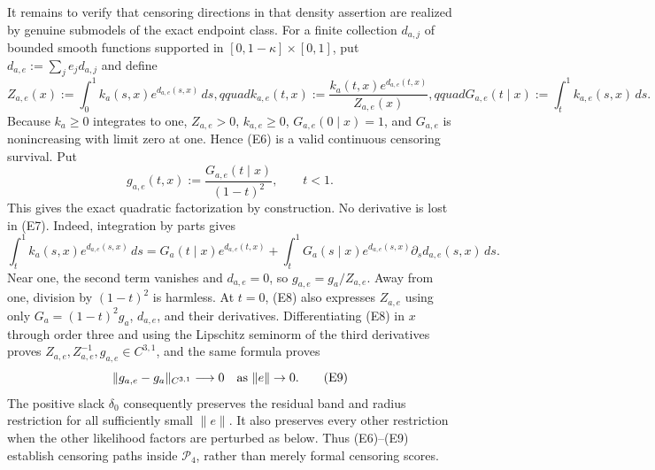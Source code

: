 It remains to verify that censoring directions in that density assertion are realized by genuine submodels of the exact endpoint class.  For a finite collection \(d_{a,j}\) of bounded smooth functions supported in \([0,1-\kappa]\times[0,1]\), put \(d_{a,e}:=\sum_je_jd_{a,j}\) and define
\[
 Z_{a,e}(x):=\int_0^1k_a(s,x)e^{d_{a,e}(s,x)}\,ds,qquad
 k_{a,e}(t,x):=\frac{k_a(t,x)e^{d_{a,e}(t,x)}}{Z_{a,e}(x)},qquad
 G_{a,e}(t\mid x):=\int_t^1k_{a,e}(s,x)\,ds.                           \tag{E6}
\]
Because \(k_a\ge0\) integrates to one, \(Z_{a,e}>0\), \(k_{a,e}\ge0\), \(G_{a,e}(0\mid x)=1\), and \(G_{a,e}\) is nonincreasing with limit zero at one.  Hence (E6) is a valid continuous censoring survival.  Put
\[
 g_{a,e}(t,x):=\frac{G_{a,e}(t\mid x)}{(1-t)^2},\qquad t<1.             \tag{E7}
\]
This gives the exact quadratic factorization by construction.  No derivative is lost in (E7).  Indeed, integration by parts gives
\[
 \int_t^1k_a(s,x)e^{d_{a,e}(s,x)}\,ds
 =G_a(t\mid x)e^{d_{a,e}(t,x)}
  +\int_t^1G_a(s\mid x)e^{d_{a,e}(s,x)}
                   \partial_sd_{a,e}(s,x)\,ds.                         \tag{E8}
\]
Near one, the second term vanishes and \(d_{a,e}=0\), so \(g_{a,e}=g_a/Z_{a,e}\).  Away from one, division by \((1-t)^2\) is harmless.  At \(t=0\), (E8) also expresses \(Z_{a,e}\) using only \(G_a=(1-t)^2g_a\), \(d_{a,e}\), and their derivatives.  Differentiating (E8) in \(x\) through order three and using the Lipschitz seminorm of the third derivatives proves \(Z_{a,e},Z_{a,e}^{-1},g_{a,e}\in C^{3,1}\), and the same formula proves
\[
 \lVert g_{a,e}-g_a\rVert_{C^{3,1}}\longrightarrow0
 \quad\hbox{as }\lVert e\rVert\to0.                                  \tag{E9}
\]
The positive slack \(\delta_0\) consequently preserves the residual band and radius restriction for all sufficiently small \(\lVert e\rVert\).  It also preserves every other restriction when the other likelihood factors are perturbed as below.  Thus (E6)--(E9) establish censoring paths inside \(\mathcal P_4\), rather than merely formal censoring scores.

